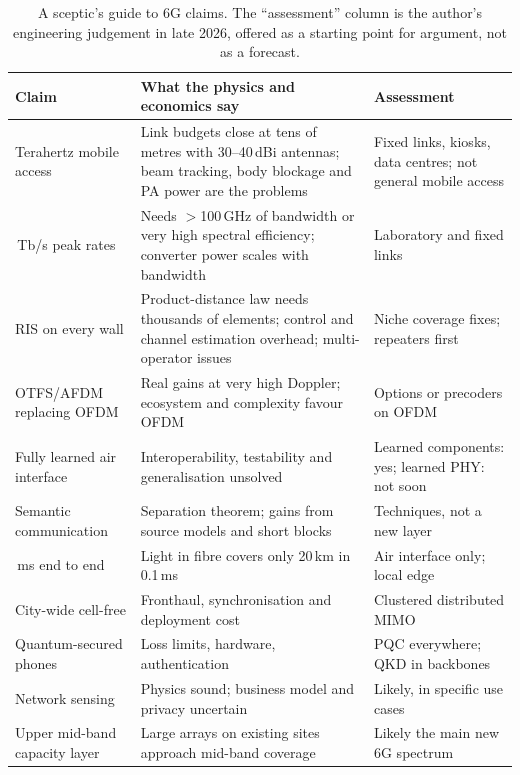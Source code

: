 \begin{table}[htbp]\centering\small
\caption{A sceptic's guide to 6G claims. The ``assessment'' column is the author's engineering judgement
in late 2026, offered as a starting point for argument, not as a forecast.}
\label{tab:ch25:hype}
\begin{tabularx}{\linewidth}{@{}>{\raggedright\arraybackslash}p{2.7cm} >{\raggedright\arraybackslash}X >{\raggedright\arraybackslash}p{3.3cm}@{}}
\toprule
Claim & What the physics and economics say & Assessment\\
\midrule
Terahertz mobile access & Link budgets close at tens of metres with 30--40\,dBi antennas; beam tracking, body blockage and PA power are the problems & Fixed links, kiosks, data centres; not general mobile access\\
1\,Tb/s peak rates & Needs $>$100\,GHz of bandwidth or very high spectral efficiency; converter power scales with bandwidth & Laboratory and fixed links\\
RIS on every wall & Product-distance law needs thousands of elements; control and channel estimation overhead; multi-operator issues & Niche coverage fixes; repeaters first\\
OTFS/AFDM replacing OFDM & Real gains at very high Doppler; ecosystem and complexity favour OFDM & Options or precoders on OFDM\\
Fully learned air interface & Interoperability, testability and generalisation unsolved & Learned components: yes; learned PHY: not soon\\
Semantic communication & Separation theorem; gains from source models and short blocks & Techniques, not a new layer\\
0.1\,ms end to end & Light in fibre covers only 20\,km in 0.1\,ms & Air interface only; local edge\\
City-wide cell-free & Fronthaul, synchronisation and deployment cost & Clustered distributed MIMO\\
Quantum-secured phones & Loss limits, hardware, authentication & PQC everywhere; QKD in backbones\\
Network sensing & Physics sound; business model and privacy uncertain & Likely, in specific use cases\\
Upper mid-band capacity layer & Large arrays on existing sites approach mid-band coverage & Likely the main new 6G spectrum\\
\bottomrule
\end{tabularx}
\end{table}

